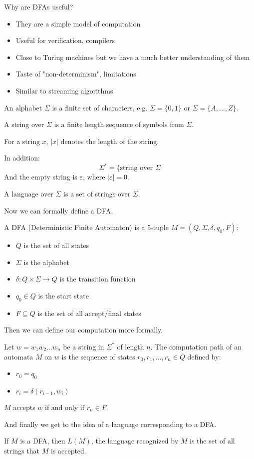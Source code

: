 Why are DFAs useful?
\begin{itemize}
    \item They are a simple model of computation
    \item Useful for verification, compilers
    \item Close to Turing machines but we have a much better understanding of them
    \item Taste of "non-determinism", limitations
    \item Similar to streaming algorithms
\end{itemize}

\begin{definition}
    An alphabet $\Sigma$ is a finite set of characters, e.g. $\Sigma = \{0, 1\}$ or $\Sigma = \{A, \dots, Z\}$.

    A string over $\Sigma$ is a finite length sequence of symbols from $\Sigma$.

    For a string $x$, $|x|$ denotes the length of the string.

    In addition:
    \[ \Sigma^* = \{\text{string over $\Sigma$} \]
    And the empty string is $\varepsilon$, where $|\varepsilon| = 0$.

    A language over $\Sigma$ is a set of strings over $\Sigma$.
\end{definition}

Now we can formally define a DFA.

\begin{definition}
    A DFA (Deterministic Finite Automaton) is a 5-tuple $M = (Q, \Sigma, \delta, q_0, F)$:
    \begin{itemize}
        \item $Q$ is the set of all states
        \item $\Sigma$ is the alphabet
        \item $\delta: Q \times \Sigma \to Q$ is the transition function
        \item $q_0 \in Q$ is the start state
        \item $F \subseteq Q$ is the set of all accept/final states
    \end{itemize}
\end{definition}

Then we can define our computation more formally.

\begin{definition}
    Let $w = w_1 w_2 \dots w_n$ be a string in $\Sigma^*$ of length $n$. The computation path of an automata $M$ on $w$ is the sequence of states
    $r_0, r_1, \dots, r_n \in Q$ defined by:
    \begin{itemize}
        \item $r_0 = q_0$
        \item $r_i = \delta(r_{i - 1}, w_i)$
    \end{itemize}
    $M$ accepts $w$ if and only if $r_n \in F$.
\end{definition}

And finally we get to the idea of a language corresponding to a DFA.

\begin{definition}
    If $M$ is a DFA, then $L(M)$, the language recognized by $M$ is the set of all strings that $M$ is accepted.
\end{definition}
